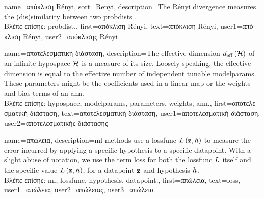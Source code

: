 {name={\foreignlanguage{greek}{απόκλιση} R\'enyi}, 
	sort={Renyi},
	description={The R\'enyi divergence 
	measures the (dis)similarity between two \gls{probdist}s \cite{RenyiInfo95}.\\
		\foreignlanguage{greek}{Βλέπε επίσης:} \gls{probdist}.}, 
	first={\foreignlanguage{greek}{απόκλιση} R\'enyi},
	text={\foreignlanguage{greek}{απόκλιση} R\'enyi},
	user1={\foreignlanguage{greek}{απόκλιση} R\'enyi}, %
	user2={\foreignlanguage{greek}{απόκλισης} R\'enyi} %
} 

{name={\foreignlanguage{greek}{αποτελεσματική διάσταση}},
	description={The effective dimension $d_{\rm eff} \left( \mathcal{H} \right)$ of 
		an infinite \gls{hypospace} $\mathcal{H}$ is a measure of its size. Loosely speaking, the 
		effective dimension is equal to the effective number of independent tunable \gls{modelparams}. 
		These \gls{parameters} might be the coefficients used in a linear map or the 
		\gls{weights} and bias terms of an \gls{ann}.\\
		\foreignlanguage{greek}{Βλέπε επίσης:} \gls{hypospace}, \gls{modelparams}, \gls{parameters}, \gls{weights}, \gls{ann}.},
	first={\foreignlanguage{greek}{αποτελεσματική διάσταση}},
	text={\foreignlanguage{greek}{αποτελεσματική διάσταση}},
	user1={\foreignlanguage{greek}{αποτελεσματική διάσταση}}, %
	user2={\foreignlanguage{greek}{αποτελεσματικής διάστασης}} %
}

{name={\foreignlanguage{greek}{απώλεια}}, 
	description={\gls{ml} methods use a 
		\gls{lossfunc} $L\left({\bf z},h \right)$ to measure the error incurred 
		by applying a specific \gls{hypothesis} to a specific \gls{datapoint}. With a
		slight abuse of notation, we use the term loss for both the \gls{lossfunc} $L$ 
		itself and the specific value $L\left({\bf z},h \right)$, for a \gls{datapoint} ${\bf z}$ 
		and \gls{hypothesis} $h$.\\
		\foreignlanguage{greek}{Βλέπε επίσης:} \gls{ml}, \gls{lossfunc}, \gls{hypothesis}, \gls{datapoint}.},
		first={\foreignlanguage{greek}{απώλεια}},
		text={loss},
		user1={\foreignlanguage{greek}{απώλεια}}, %
		user2={\foreignlanguage{greek}{απώλειας}}, %
		user3={\foreignlanguage{greek}{απώλεια}} %
}

